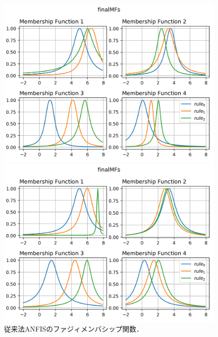 \documentclass{ujarticle}
\begin{document}
\begin{figure}[!htb]
  \begin{minipage}{0.45\hsize}
    \centering
    \includegraphics[width=\textwidth]{Final_mf_anfis_00.png}
  \end{minipage}
  \begin{minipage}{0.45\hsize}
    \centering
    \includegraphics[width=\textwidth]{Final_mf_anfis_50.png}
  \end{minipage}
  \caption{従来法ANFISのファジィメンバシップ関数．}
  \label{fig: membership of conventional ANFIS}
\end{figure}
\end{document}
